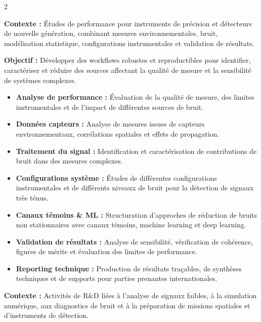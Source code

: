 \documentclass[8pt,a4paper,ragged2e,withhyper]{altacv}
\begin{document}
\begin{paracol}{2}
\divider


\textbf{Contexte :} Études de performance pour instruments de précision et détecteurs de nouvelle génération, combinant mesures environnementales, bruit, modélisation statistique, configurations instrumentales et validation de résultats.

\textbf{Objectif :} Développer des workflows robustes et reproductibles pour identifier, caractériser et réduire des sources affectant la qualité de mesure et la sensibilité de systèmes complexes.

\begin{itemize}
  \item \textbf{Analyse de performance :} Évaluation de la qualité de mesure, des limites instrumentales et de l’impact de différentes sources de bruit.
  \item \textbf{Données capteurs :} Analyse de mesures issues de capteurs environnementaux, corrélations spatiales et effets de propagation.
  \item \textbf{Traitement du signal :} Identification et caractérisation de contributions de bruit dans des mesures complexes.
  \item \textbf{Configurations système :} Études de différentes configurations instrumentales et de différents niveaux de bruit pour la détection de signaux très ténus.
  \item \textbf{Canaux témoins \& ML :} Structuration d’approches de réduction de bruits non stationnaires avec canaux témoins, machine learning et deep learning.
  \item \textbf{Validation de résultats :} Analyse de sensibilité, vérification de cohérence, figures de mérite et évaluation des limites de performance.
  \item \textbf{Reporting technique :} Production de résultats traçables, de synthèses techniques et de supports pour parties prenantes internationales.
\end{itemize}

\divider


\textbf{Contexte :} Activités de R\&D liées à l’analyse de signaux faibles, à la simulation numérique, aux diagnostics de bruit et à la préparation de missions spatiales et d’instruments de détection.


\end{paracol}
\end{document}
